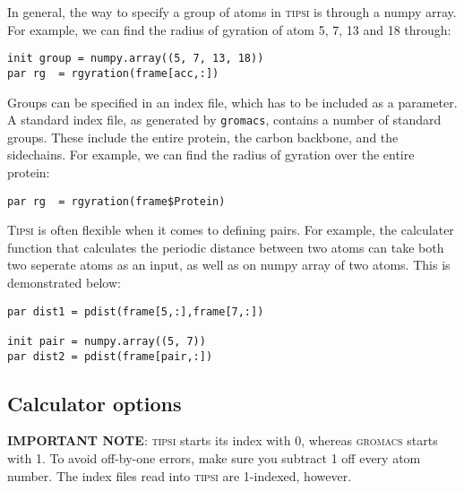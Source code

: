 \documentclass[]{article}
\begin{document}
In general, the way to specify a group of atoms in \textsc{tipsi} is through a numpy array. 
For example, we can find the radius of gyration of atom 5, 7, 13 and 18 through:

\begin{lstlisting}
init group = numpy.array((5, 7, 13, 18))
par rg  = rgyration(frame[acc,:])
\end{lstlisting}

Groups can be specified in an index file, which has to be included as a parameter. 
A standard index file, as generated by \texttt{gromacs}, contains a number of standard groups. 
These include the entire protein, the carbon backbone, and the sidechains. For example, we can find the radius of gyration over the entire protein:

\begin{lstlisting}
par rg  = rgyration(frame$Protein)
\end{lstlisting}

\textsc{Tipsi} is often flexible when it comes to defining pairs. For example, the calculater function that calculates the periodic distance between two atoms can take both two seperate atoms as an input, as well as on numpy array of two atoms. This is demonstrated below:

\begin{lstlisting}
par dist1 = pdist(frame[5,:],frame[7,:])

init pair = numpy.array((5, 7))
par dist2 = pdist(frame[pair,:]) 
\end{lstlisting}

\subsection*{Calculator options}

\textbf{IMPORTANT NOTE}: \textsc{tipsi} starts its index with 0, whereas \textsc{gromacs} starts with 1. To avoid off-by-one errors, make sure you subtract 1 off every atom number. The index files read into \textsc{tipsi} are 1-indexed, however.
\end{document}
